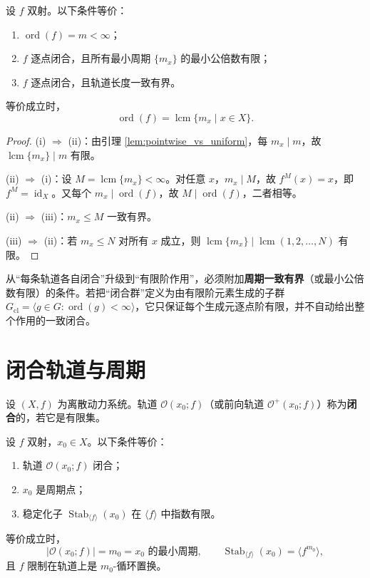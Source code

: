 \begin{theorem}[有限阶的轨道刻划]\label{thm:finite_order_orbit}
设 $f$ 双射。以下条件等价：
\begin{enumerate}[label=(\roman*)]
    \item $\operatorname{ord}(f)=m<\infty$；
    \item $f$ 逐点闭合，且所有最小周期 $\{m_x\}$ 的最小公倍数有限；
    \item $f$ 逐点闭合，且轨道长度一致有界。
\end{enumerate}
等价成立时，
\[
\operatorname{ord}(f)=\operatorname{lcm}\{m_x\mid x\in X\}.
\]
\end{theorem}

\begin{proof}
(i) $\Rightarrow$ (ii)：由引理 \ref{lem:pointwise_vs_uniform}，每 $m_x\mid m$，故 $\operatorname{lcm}\{m_x\}\mid m$ 有限。

(ii) $\Rightarrow$ (i)：设 $M=\operatorname{lcm}\{m_x\}<\infty$。对任意 $x$，$m_x\mid M$，故 $f^M(x)=x$，即 $f^M=\operatorname{id}_X$。又每个 $m_x\mid\operatorname{ord}(f)$，故 $M\mid\operatorname{ord}(f)$，二者相等。

(ii) $\Rightarrow$ (iii)：$m_x\le M$ 一致有界。

(iii) $\Rightarrow$ (ii)：若 $m_x\le N$ 对所有 $x$ 成立，则 $\operatorname{lcm}\{m_x\}\mid\operatorname{lcm}(1,2,\dots,N)$ 有限。
\end{proof}

\begin{remark}[严格性要点]\label{rem:finite_order_caution}
从“每条轨道各自闭合”升级到“有限阶作用”，必须附加\textbf{周期一致有界}（或最小公倍数有限）的条件。若把“闭合群”定义为由有限阶元素生成的子群 $G_{\mathrm{cl}}=\langle g\in G:\operatorname{ord}(g)<\infty\rangle$，它只保证每个生成元逐点阶有限，并不自动给出整个作用的一致闭合。
\end{remark}

\section{闭合轨道与周期}

\begin{definition}[闭合轨道]\label{def:closed_orbit}
设 $(X,f)$ 为离散动力系统。轨道 $\mathcal{O}(x_0;f)$（或前向轨道 $\mathcal{O}^+(x_0;f)$）称为\textbf{闭合}的，若它是有限集。
\end{definition}

\begin{theorem}[闭合轨道的判据]\label{thm:closed_orbit_criterion}
设 $f$ 双射，$x_0\in X$。以下条件等价：
\begin{enumerate}[label=(\roman*)]
    \item 轨道 $\mathcal{O}(x_0;f)$ 闭合；
    \item $x_0$ 是周期点；
    \item 稳定化子 $\operatorname{Stab}_{\langle f\rangle}(x_0)$ 在 $\langle f\rangle$ 中指数有限。
\end{enumerate}
等价成立时，
\[
|\mathcal{O}(x_0;f)|=m_0=\text{$x_0$ 的最小周期},
\qquad
\operatorname{Stab}_{\langle f\rangle}(x_0)=\langle f^{m_0}\rangle,
\]
且 $f$ 限制在轨道上是 $m_0$-循环置换。
\end{theorem}


